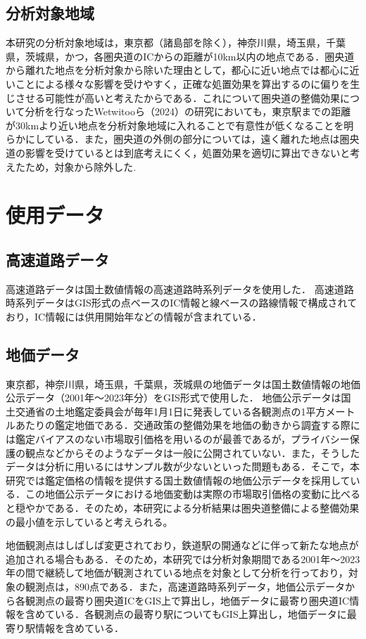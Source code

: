 \subsection{分析対象地域}
本研究の分析対象地域は，東京都（諸島部を除く），神奈川県，埼玉県，千葉県，茨城県，かつ，各圏央道のICからの距離が10km以内の地点である．圏央道から離れた地点を分析対象から除いた理由として，都心に近い地点では都心に近いことによる様々な影響を受けやすく，正確な処置効果を算出するのに偏りを生じさせる可能性が高いと考えたからである．これについて圏央道の整備効果について分析を行なったWetwitooら（2024）\cite{Weteitoo2024}の研究においても，東京駅までの距離が30kmより近い地点を分析対象地域に入れることで有意性が低くなることを明らかにしている．また，圏央道の外側の部分については，遠く離れた地点は圏央道の影響を受けているとは到底考えにくく，処置効果を適切に算出できないと考えたため，対象から除外した.

\section{使用データ}

\subsection{高速道路データ}
高速道路データは国土数値情報の高速道路時系列データを使用した．
高速道路時系列データはGIS形式の点ベースのIC情報と線ベースの路線情報で構成されており，IC情報には供用開始年などの情報が含まれている．

\subsection{地価データ}
東京都，神奈川県，埼玉県，千葉県，茨城県の地価データは国土数値情報の地価公示データ（2001年〜2023年分）をGIS形式で使用した．
地価公示データは国土交通省の土地鑑定委員会が毎年1月1日に発表している各観測点の1平方メートルあたりの鑑定地価である．交通政策の整備効果を地価の動きから調査する際には鑑定バイアスのない市場取引価格を用いるのが最善であるが，プライバシー保護の観点などからそのようなデータは一般に公開されていない．また，そうしたデータは分析に用いるにはサンプル数が少ないといった問題もある．そこで，本研究では鑑定価格の情報を提供する国土数値情報の地価公示データを採用している．\cite{shimizu2006}\cite{kunimi2021}この地価公示データにおける地価変動は実際の市場取引価格の変動に比べると穏やかである．そのため，本研究による分析結果は圏央道整備による整備効果の最小値を示していると考えられる。

地価観測点はしばしば変更されており，鉄道駅の開通などに伴って新たな地点が追加される場合もある．そのため，本研究では分析対象期間である2001年～2023年の間で継続して地価が観測されている地点を対象として分析を行っており，対象の観測点は，890点である．また，高速道路時系列データ，地価公示データから各観測点の最寄り圏央道ICをGIS上で算出し，地価データに最寄り圏央道IC情報を含めている．各観測点の最寄り駅についてもGIS上算出し，地価データに最寄り駅情報を含めている．

